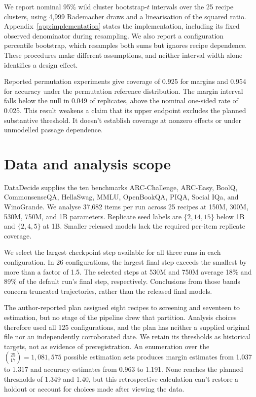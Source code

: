 \documentclass{article}
\begin{document}
We report nominal 95\% wild cluster bootstrap-$t$ intervals over the 25 recipe clusters, using 4,999 Rademacher draws and a linearisation of the squared ratio. Appendix~\ref{app:implementation} states the implementation, including its fixed observed denominator during resampling. We also report a configuration percentile bootstrap, which resamples both sums but ignores recipe dependence. These procedures make different assumptions, and neither interval width alone identifies a design effect.

Reported permutation experiments give coverage of 0.925 for margins and 0.954 for accuracy under the permutation reference distribution. The margin interval falls below the null in 0.049 of replicates, above the nominal one-sided rate of 0.025. This result weakens a claim that its upper endpoint excludes the planned substantive threshold. It doesn't establish coverage at nonzero effects or under unmodelled passage dependence.

\section{Data and analysis scope}
DataDecide supplies the ten benchmarks ARC-Challenge, ARC-Easy, BoolQ, CommonsenseQA, HellaSwag, MMLU, OpenBookQA, PIQA, Social IQa, and WinoGrande. We analyse 37,682 items per run across 25 recipes at 150M, 300M, 530M, 750M, and 1B parameters. Replicate seed labels are $\{2,14,15\}$ below 1B and $\{2,4,5\}$ at 1B. Smaller released models lack the required per-item replicate coverage.

We select the largest checkpoint step available for all three runs in each configuration. In 26 configurations, the largest final step exceeds the smallest by more than a factor of 1.5. The selected steps at 530M and 750M average 18\% and 89\% of the default run's final step, respectively. Conclusions from those bands concern truncated trajectories, rather than the released final models.

The author-reported plan assigned eight recipes to screening and seventeen to estimation, but no stage of the pipeline drew that partition. Analysis choices therefore used all 125 configurations, and the plan has neither a supplied original file nor an independently corroborated date. We retain its thresholds as historical targets, not as evidence of preregistration. An enumeration over the $\binom{25}{17}=1{,}081{,}575$ possible estimation sets produces margin estimates from 1.037 to 1.317 and accuracy estimates from 0.963 to 1.191. None reaches the planned thresholds of 1.349 and 1.40, but this retrospective calculation can't restore a holdout or account for choices made after viewing the data.
\end{document}
